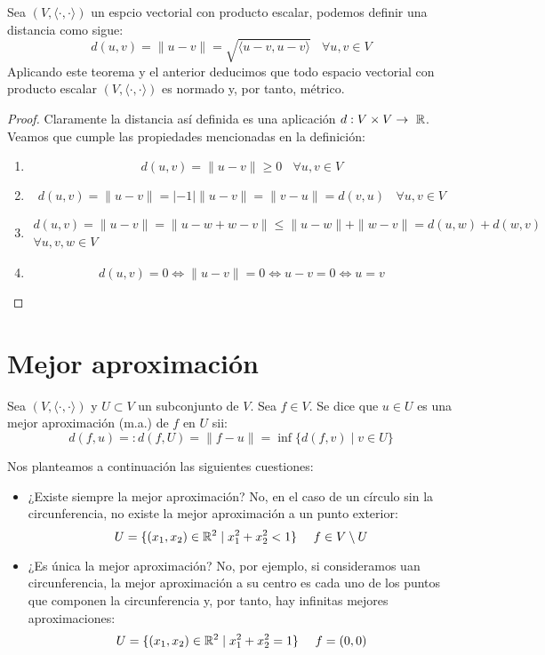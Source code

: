 \begin{teo}
    Sea $(V,\langle \cdot,\cdot \rangle)$ un espcio vectorial con producto escalar, podemos definir una distancia como sigue:
    $$d(u,v) = \|u-v\| = \sqrt{\langle u-v,u-v \rangle}~~~~\forall u,v \in V$$
    Aplicando este teorema y el anterior deducimos que todo espacio vectorial con producto escalar $(V,\langle \cdot, \cdot \rangle)$
    es normado y, por tanto, métrico.
\end{teo}
\begin{proof}
    Claramente la distancia así definida es una aplicación $d:V\times V \rightarrow~\mathbb R$. Veamos que cumple las propiedades mencionadas en la definición:
    \begin{enumerate}
        \item $$d(u,v) = \|u-v\| \geq 0~~~~\forall u,v \in V$$
        \item $$d(u,v) = \|u-v\| = |-1| \|u-v\| = \|v-u\| = d(v,u)~~~~\forall u,v \in V$$
        \item \begin{multline*}
            d(u,v) = \|u-v\| = \|u-w+w-v\| \leq \|u-w\| + \|w-v\| = d(u,w) + d(w,v)\\\forall u,v,w \in V
        \end{multline*}
    \item $$d(u,v)=0 \Leftrightarrow \|u-v\| = 0 \Leftrightarrow u-v=0 \Leftrightarrow u=v$$
    \end{enumerate}
\end{proof}

\section{Mejor aproximación}
\begin{definicion}
    Sea $(V, \langle \cdot, \cdot \rangle)$ y $U \subset V$ un subconjunto de $V$.
    Sea $f \in V$. Se dice que $u\in U$ es una mejor aproximación (m.a.) de $f$ en $U$ sii:
    $$d(f,u) =: d(f,U) = \|f-u\| = \inf\{d(f,v) \mid v \in U\}$$
\end{definicion}

\bigskip
\noindent
Nos planteamos a continuación las siguientes cuestiones:
\begin{itemize}
    \item ¿Existe siempre la mejor aproximación?\newline
          No, en el caso de un círculo sin la circunferencia, no existe la mejor aproximación a un punto exterior:
          $$U = \{(x_1,x_2)\in \mathbb R^2 \mid x_1^2 + x_2^2 < 1\}~~~~f \in V\setminus U$$
    \item ¿Es única la mejor aproximación?\newline
          No, por ejemplo, si consideramos uan circunferencia, la mejor aproximación a su centro es cada uno de los puntos que
          componen la circunferencia y, por tanto, hay infinitas mejores aproximaciones:
          $$U = \{(x_1, x_2)\in \mathbb R^2 \mid x_1^2 + x_2^2 = 1 \}~~~~f = (0,0)$$
\end{itemize}

